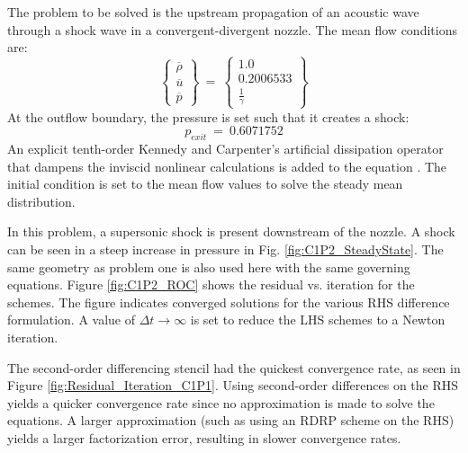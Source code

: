 \documentclass[conf]{new-aiaa}
\begin{document}
The problem to be solved is the upstream propagation of an acoustic wave through a shock wave in a convergent-divergent nozzle. The mean flow conditions are: 
\begin{equation*}
	\left\{
	\begin{matrix}
		\overline{\rho} \\
		\overline{u} \\
		\overline{p}
	\end{matrix}
	\right\}~=~
	\left\{
	\begin{matrix}
		1.0 \\
		0.2006533 \\
		\frac{1}{\gamma}
	\end{matrix}
	\right\}
\end{equation*}
At the outflow boundary, the pressure is set such that it creates a shock: 
\begin{equation*}
	p_{exit}~=~0.6071752
\end{equation*}
An explicit tenth-order Kennedy and Carpenter's artificial dissipation operator that dampens the inviscid nonlinear calculations is added to the equation \cite{Kennedy_Carp}. The initial condition is set to the mean flow values to solve the steady mean distribution. 

In this problem, a supersonic shock is present downstream of the nozzle.
A shock can be seen in a steep increase in pressure in Fig. \ref{fig:C1P2_SteadyState}. 
The same geometry as problem one is also used here with the same governing equations.
Figure \ref{fig:C1P2_ROC} shows the residual vs. iteration for the schemes. 
The figure indicates converged solutions for the various RHS difference formulation. 
A value of $\Delta{t}\to\infty$ is set to reduce the LHS schemes to a Newton iteration. 

The second-order differencing stencil had the quickest convergence rate, as seen in Figure \ref{fig:Residual_Iteration_C1P1}. 
Using second-order differences on the RHS yields a quicker convergence rate since no approximation is made to solve the equations. 
A larger approximation (such as using an RDRP scheme on the RHS) yields a larger factorization error, resulting in slower convergence rates. 
\end{document}
